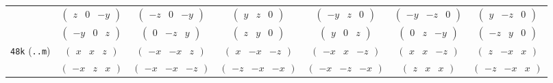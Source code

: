 \documentclass[fleqn,9pt,landscape]{jsarticle}
\begin{document}
\begin{center}
\begin{longtable}{ccccccc}
& $ \begin{pmatrix} z & 0 & - y \end{pmatrix} $ & $ \begin{pmatrix} - z & 0 & - y \end{pmatrix} $ & $ \begin{pmatrix} y & z & 0 \end{pmatrix} $ & $ \begin{pmatrix} - y & z & 0 \end{pmatrix} $ & $ \begin{pmatrix} - y & - z & 0 \end{pmatrix} $ & $ \begin{pmatrix} y & - z & 0 \end{pmatrix} $ \\
& $ \begin{pmatrix} - y & 0 & z \end{pmatrix} $ & $ \begin{pmatrix} 0 & - z & y \end{pmatrix} $ & $ \begin{pmatrix} z & y & 0 \end{pmatrix} $ & $ \begin{pmatrix} y & 0 & z \end{pmatrix} $ & $ \begin{pmatrix} 0 & z & - y \end{pmatrix} $ & $ \begin{pmatrix} - z & y & 0 \end{pmatrix} $ \\ \hline
{\tt 48k} ({\tt ..m}) & $ \begin{pmatrix} x & x & z \end{pmatrix} $ & $ \begin{pmatrix} - x & - x & z \end{pmatrix} $ & $ \begin{pmatrix} x & - x & - z \end{pmatrix} $ & $ \begin{pmatrix} - x & x & - z \end{pmatrix} $ & $ \begin{pmatrix} x & x & - z \end{pmatrix} $ & $ \begin{pmatrix} z & - x & x \end{pmatrix} $ \\
& $ \begin{pmatrix} - x & z & x \end{pmatrix} $ & $ \begin{pmatrix} - x & - x & - z \end{pmatrix} $ & $ \begin{pmatrix} - z & - x & - x \end{pmatrix} $ & $ \begin{pmatrix} - x & - z & - x \end{pmatrix} $ & $ \begin{pmatrix} z & x & x \end{pmatrix} $ & $ \begin{pmatrix} - z & - x & x \end{pmatrix} $ \\

\end{longtable}
\end{center}
\end{document}
